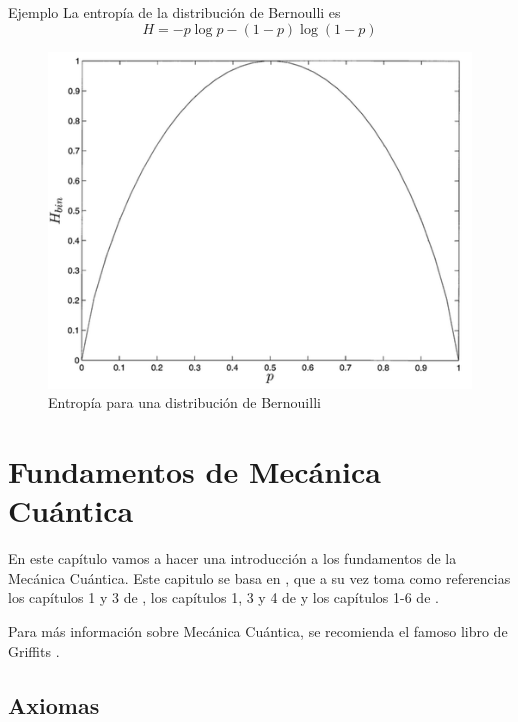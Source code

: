 \documentclass[a4paper,11pt]{book} %
\numberwithin{equation}{chapter}
\begin{document}
	\begin{mybox_green}{Ejemplo}
	La entropía de la distribución de Bernoulli es 
	\begin{equation}
	H = - p\log p -(1-p)\log (1-p)
	\end{equation}
	
		\begin{figure}[H]
		\centering 
		\includegraphics[width=0.5\linewidth]{Figuras/Fig_formalismo_binaryentropy.png}
		\caption{Entropía para una distribución de Bernouilli}
		\label{Fig_formalismo_binaryentropy}
		\end{figure}
	\end{mybox_green}
	
















\chapter{Fundamentos de Mecánica Cuántica} \label{cap_fundamentos}

En este capítulo vamos a hacer una introducción a los fundamentos de la Mecánica Cuántica. Este capitulo se basa en \cite{bib_Curso-JMas}, que a su vez toma como referencias los capítulos 1 y 3 de \cite{bib_Claude}, los capítulos 1, 3 y 4 de \cite{bib_le_bellac_2006} y los capítulos 1-6 de \cite{bib_fayngold2013quantum}. 

Para más información sobre Mecánica Cuántica, se recomienda el famoso libro de Griffits \cite{bib_griffiths_schroeter_2018}.

	\section{Axiomas}
\end{document}
